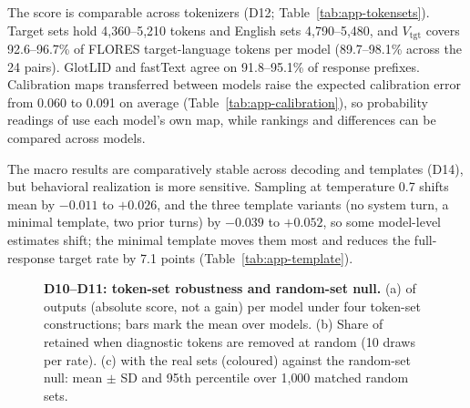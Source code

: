 The score is comparable across tokenizers (D12; Table~\ref{tab:app-tokensets}). Target sets hold 4{,}360--5{,}210 tokens and English sets 4{,}790--5{,}480, and $V_{\mathrm{tgt}}$ covers 92.6--96.7\% of FLORES target-language tokens per model (89.7--98.1\% across the 24 pairs). GlotLID and fastText agree on 91.8--95.1\% of response prefixes. Calibration maps transferred between models raise the expected calibration error from 0.060 to 0.091 on average (Table~\ref{tab:app-calibration}), so probability readings of \dM use each model's own map, while rankings and differences can be compared across models.

The macro \dM results are comparatively stable across decoding and templates (D14), but behavioral realization is more sensitive. Sampling at temperature 0.7 shifts mean \dM by $-0.011$ to $+0.026$, and the three template variants (no system turn, a minimal template, two prior turns) by $-0.039$ to $+0.052$, so some model-level \dM estimates shift; the minimal template moves them most and reduces the \foxp full-response target rate by 7.1 points (Table~\ref{tab:app-template}).

\begin{figure}[!htbp]
  \centering
  \caption{\textbf{D10--D11: token-set robustness and random-set null.} (a)  of \foxp outputs (absolute score, not a gain) per model under four token-set constructions; bars mark the mean over models. (b) Share of  retained when diagnostic tokens are removed at random (10 draws per rate). (c)  with the real sets (coloured) against the random-set null: mean $\pm$ SD and 95th percentile over 1{,}000 matched random sets.}
  \label{fig:app-tokenset}
\end{figure}

